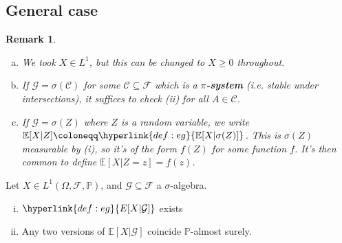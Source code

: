 \documentclass{article}
\newtheorem{nremark}[nthm]{Remark}
\newcommand{\named}[1]{\textbf{#1}\index{#1}}
\newcommand{\F}{\mathcal{F}}
\newcommand{\G}{\mathcal{G}}
\newcommand{\1}[1]{\mathbbm{1}_{#1}}
\newcommand{\Prob}{\mathbb{P}}
\newcommand{\E}{\mathbb{E}}
\begin{document}
\subsection{General case}
\begin{nremark}\leavevmode
  \begin{enumerate}[(a)]
    \item We took $X \in L^1$, but this can be changed to $X \geq 0$ throughout.
    \item If $\G = \sigma(\mathcal{C})$ for some $\mathcal{C} \subseteq \F$ which is a \hypertarget{def:pisystem}{\named{$\pi$-system}} (i.e. stable under intersections), it suffices to check (ii) for all $A \in \mathcal{C}$.
    \item If $\G = \sigma(Z)$ where $Z$ is a random variable, we write $\E[X | Z] \coloneqq \hyperlink{def:eg}{\E[X | \sigma(Z)]}$. This is $\sigma(Z)$ measurable by (i), so it's of the form $f(Z)$ for some function $f$.
      It's then common to define $\E[X | Z=z] = f(z)$.
  \end{enumerate}
\end{nremark}
\begin{nthm}\label{thm:1.4}
  Let $X \in L^1(\Omega, \F, \Prob)$, and $\G \subseteq \F$ a $\sigma$-algebra.
  \begin{enumerate}[(i)]
    \item $\hyperlink{def:eg}{E[X | \G]}$ exists
    \item Any two versions of $\E[X | \G]$ coincide $\Prob$-almost surely.
  \end{enumerate}
\end{nthm}
\end{document}
